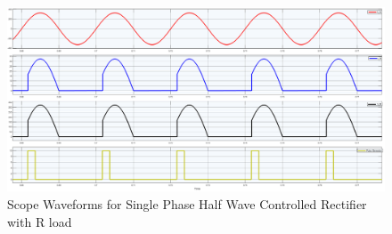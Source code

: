 \begin{figure}[h]
    \centering
    \includegraphics[width=1\textwidth]{images/experiment-1/circuit-scope-simulation-05.png}
    \caption{Scope Waveforms for Single Phase Half Wave Controlled Rectifier with R load}
    \label{Fig_waveform_single-phase-half-wave-controlled-rectifier-with-R-load}
\end{figure}

\pagebreak
